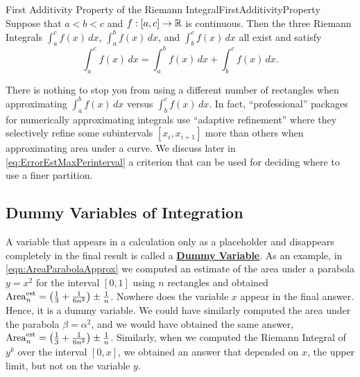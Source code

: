 \begin{propColor}{First Additivity Property of the Riemann Integral}{FirstAdditivityProperty} Suppose that $a < b <c$ and $f:[a, c] \to \mathbb R$ is continuous. Then the three Riemann Integrals  $\int_{a}^{c} f(x)\, dx$, $\int_{a}^{b} f(x)\, dx$, and $\int_{b}^{c} f(x)\, dx$ all exist and satisfy
\begin{equation}
\label{eq:FirstAdditivityProperty}
    \int_{a}^{c} f(x)\, dx =\int_{a}^{b} f(x)\, dx + \int_{b}^{c} f(x)\, dx.
\end{equation}
    
\end{propColor}

\bigskip

\begin{rem} There is nothing to stop you from using a different number of rectangles when approximating $\int_{a}^{b} f(x)\, dx$ versus $\int_{b}^{c} f(x)\, dx$. In fact, ``professional'' packages for numerically approximating integrals use ``adaptive refinement'' where they selectively refine some subintervals $[x_i, x_{i+1}]$ more than others when approximating area under a curve. We discuss later in \eqref{eq:ErrorEstMaxPerinterval} a criterion that can be used for deciding where to use a finer partition.    
\end{rem}




\subsection{Dummy Variables of Integration}

A variable that appears in a calculation only as a placeholder and disappears completely in the final result is called a \href{https://mathworld.wolfram.com/DummyVariable.html}{\bf Dummy Variable}. As an example, in \eqref{eqn:AreaParabolaApprox} we computed an estimate of the area under a parabola $y = x^2$ for the interval $[0, 1]$ using $n$ rectangles and obtained $ {\rm Area}^{\rm est}_n = \left( \frac{1}{3} + \frac{1}{6n^2} \right) \pm \frac{1}{n}$. Nowhere does the variable $x$ appear in the final answer. Hence, it is a dummy variable. We could have similarly computed the area under the parabola $ \beta = \alpha^2$, and we would have obtained the same answer, 
 ${\rm Area}^{\rm est}_n = \left( \frac{1}{3} + \frac{1}{6n^2} \right) \pm \frac{1}{n}$. Similarly, when we computed the Riemann Integral of $y^k$ over the interval $[0, x]$, we obtained an answer that depended on $x$, the upper limit, but not on the variable $y$. 
 
